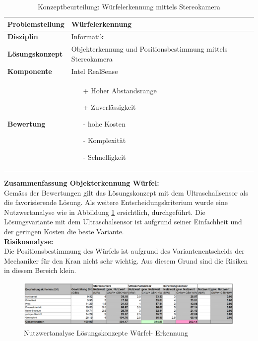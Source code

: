 \documentclass[../../main.tex]{subfiles}
\begin{document}
    \begin{flushleft}
        \begin{table}[H]
        \begin{tabular}{ | l | p{11cm} |}
        \hline
        \textbf{Problemstellung} & Würfelerkennung \\ \hline
        \textbf{Disziplin} & Informatik \\ \hline
        \textbf{Lösungskonzept} & Objekterkennung und Positionsbestimmung mittels Stereokamera \\ \hline
        \textbf{Komponente} & Intel RealSense \\ \hline
        \textbf{Bewertung} &  \begin{itemize}
                                \item[+] Hoher Abstandsrange
                                \item[+] Zuverlässigkeit
                                \item[-] hohe Kosten 
                                \item[-] Komplexität
                                \item[-] Schnelligkeit   
                              \end{itemize} \\ \hline
        \end{tabular}
        \caption{Konzeptbeurteilung: Würfelerkennung mittels Stereokamera}
        \label{tab:konzept_wurfel_Stereokamera}
    \end{table}
    \end{flushleft}


    \textbf{Zusammenfassung Objekterkennung Würfel:}\\
    Gemäss der Bewertungen gilt das Lösungskonzept mit dem Ultraschallsensor als die favorisierende Lösung. Als weitere Entscheidungskriterium wurde eine Nutzwertanalyse wie in Abbildung \ref{fig:nutzwer_wurfel} ersichtlich, durchgeführt. Die Lösungsvariante mit dem Ultraschalsensor ist aufgrund seiner Einfachheit und der geringen Kosten die beste Variante.\\ 
    \textbf{Risikoanalyse:}\\
    Die Positionsbestimmung des Würfels ist aufgrund des Variantenentscheids der Mechaniker für den Kran nicht sehr wichtig. Aus diesem Grund sind die Risiken in diesem Bereich klein.\\

    \begin{figure}[H]
        \centering
        \includegraphics[width=1\textwidth]{Nutzwert_wurfel.png}
        \caption{Nutzwertanalyse Lösungskonzepte Würfel- Erkennung}
        \label{fig:nutzwer_wurfel}
    \end{figure}
\end{document}
